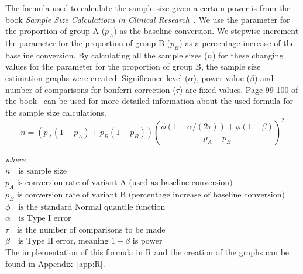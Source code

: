 \documentclass{report}
\begin{document}
The formula used to calculate the sample size given a certain power is from the book \textit{Sample Size Calculations in Clinical Research}~\cite{chow2007sample}. We use the parameter for the proportion of group A ($p_A$) as the baseline conversion. We stepwise increment the parameter for the proportion of group B ($p_B$) as a percentage increase of the baseline conversion. By calculating all the sample sizes ($n$) for these changing values for the parameter for the proportion of group B, the sample size estimation graphs were created. Significance level ($\alpha$), power value ($\beta$) and number of comparisons for bonferri correction ($\tau$) are fixed values. Page 99-100 of the book~\cite{chow2007sample} can be used for more detailed information about the used formula for the sample size calculations. \\

$$n=\left(p_A(1-p_A)+p_B(1-p_B)\right)\left(\frac{\phi(1-\alpha/(2\tau))+\phi(1-\beta)}{p_A-p_B}\right)^2$$

\textit{where}\\
$n \textrm{   is sample size}$\\
$p_A \textrm{ is conversion rate of variant A (used as baseline conversion)}$\\
$p_B \textrm{ is conversion rate of variant B (percentage increase of baseline conversion)}$\\
$\phi \textrm{   is the standard Normal quantile function}$\\
$\alpha \textrm{   is Type I error}$\\
$\tau \textrm{   is the number of comparisons to be made}$\\
$\beta \textrm{   is Type II error, meaning } 1-\beta \textrm{ is power}$\\

The implementation of this formula in R and the creation of the graphs can be found in Appendix~\ref{app:R}.
\end{document}
